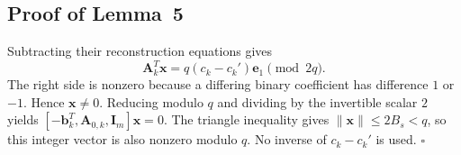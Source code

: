 \documentclass[lettersize,journal]{IEEEtran}
\newenvironment{proof}{{\noindent\it Proof:} }{\hfill $\square$\par}
\begin{document}
\subsection{Proof of Lemma~5}
\label{app:proof-commitment-extraction}
\begin{proof}
	Subtracting their reconstruction equations gives
	\[
	\mathbf A_k^T\mathbf x=q(c_k-c_k')\mathbf e_1\pmod{2q}.
	\]
	The right side is nonzero because a differing binary coefficient has difference $1$ or $-1$. Hence $\mathbf x\ne0$. Reducing modulo $q$ and dividing by the invertible scalar $2$ yields $[-\mathbf b_k^T,\mathbf A_{0,k},\mathbf I_m]\mathbf x=0$. The triangle inequality gives $\|\mathbf x\|\le2B_s<q$, so this integer vector is also nonzero modulo $q$. No inverse of $c_k-c_k'$ is used.
\end{proof}
\end{document}
